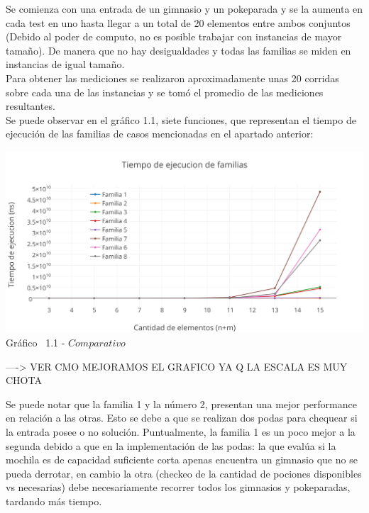 Se comienza con una entrada de un gimnasio y un pokeparada y se la aumenta en cada test en uno hasta llegar a un total de 20 elementos entre ambos conjuntos (Debido al poder de computo, no es posible trabajar con instancias de mayor tamaño). De manera que no hay desigualdades y todas las familias se miden en instancias de igual tamaño.\\

Para obtener las mediciones se realizaron aproximadamente unas 20 corridas sobre cada una de las instancias y se tom\'o el promedio de las mediciones resultantes.\\ 

Se puede observar en el  gráfico 1.1, siete funciones, que representan el tiempo de ejecuci\'on de las familias de casos mencionadas en el apartado anterior:\\


\vspace*{0.3cm} \vspace*{0.3cm}
  \begin{center}
 \includegraphics[scale=0.65]{./EJ1/comparativo.png}
 {Gr\'afico \ 1.1 - $Comparativo$}
  \end{center}
  \vspace*{0.3cm}
----> VER CMO MEJORAMOS EL GRAFICO YA Q LA ESCALA ES MUY CHOTA
  
Se puede notar que la familia 1 y la n\'umero 2, presentan una mejor performance en relaci\'on a las otras. Esto se debe a que se realizan dos podas para chequear si la entrada posee o no soluci\'on. Puntualmente, la familia 1 es un poco mejor a la segunda debido a que en la implementaci\'on de las podas: la que evalúa si la mochila es de capacidad suficiente corta apenas encuentra un gimnasio que no se pueda derrotar, en cambio la otra (checkeo de la cantidad de pociones disponibles vs necesarias) debe necesariamente recorrer todos los gimnasios y pokeparadas, tardando más tiempo.



